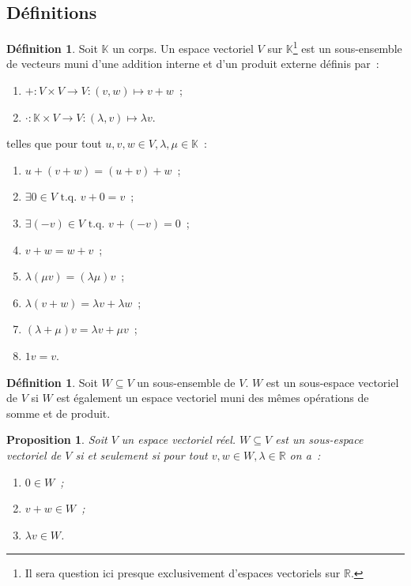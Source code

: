 \documentclass{article}
\newcommand{\R}{\mathbb R}
\newcommand{\tq}{\textrm{ t.q. }}
\newtheorem{prp}[thm]{Proposition}
\theoremstyle{definition}
\newtheorem{déf}[thm]{Définition}
\theoremstyle{remark}
\begin{document}
	\subsection{Définitions}
		\begin{déf} Soit $\mathbb K$ un corps. Un espace vectoriel $V$ sur $\mathbb K$\footnote{Il sera question ici presque exclusivement d'espaces vectoriels sur $\R$.}
		est un sous-ensemble de vecteurs muni d'une addition interne et d'un produit externe définis par~:
		\begin{enumerate}
			\item $+ : V \times V \to V : (v, w) \mapsto v+w$~;
			\item $\cdot : \mathbb K \times V \to V : (\lambda, v) \mapsto \lambda v$.
		\end{enumerate}
		telles que pour tout $u, v, w \in V, \lambda, \mu \in \mathbb K$~:
		\begin{enumerate}
			\item $u + (v + w) = (u + v) + w$~;
			\item $\exists 0 \in V \tq v + 0 = v$~;
			\item $\exists (-v) \in V \tq v + (-v) = 0$~;
			\item $v + w = w + v$~;
			\item $\lambda(\mu v) = (\lambda\mu)v$~;
			\item $\lambda (v+w) = \lambda v + \lambda w$~;
			\item $(\lambda + \mu)v = \lambda v + \mu v$~;
			\item $1v = v$.
		\end{enumerate}
		\end{déf}

		\begin{déf} Soit $W \subseteq V$ un sous-ensemble de $V$. $W$ est un sous-espace vectoriel de $V$ si $W$ est également un espace vectoriel muni des mêmes
		opérations de somme et de produit. \end{déf}

		\begin{prp}\label{conditionsSousEspace} Soit $V$ un espace vectoriel réel. $W \subseteq V$ est un sous-espace vectoriel de $V$ si et seulement si pour tout
		$v, w \in W, \lambda \in \R$ on a~:
		\begin{enumerate}
			\item $0 \in W$~;
			\item $v+w \in W$~;
			\item $\lambda v \in W$.
		\end{enumerate}
		\end{prp}
\end{document}

